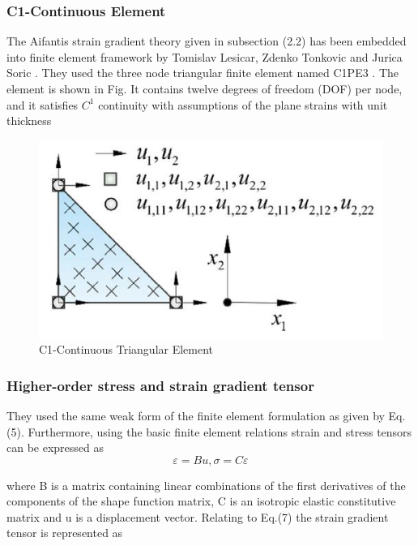 \documentclass[12pt]{article}
\begin{document}
\subsubsection{ C1-Continuous Element}
The Aifantis strain gradient theory given in subsection (2.2) has been embedded into finite element framework by Tomislav Lesicar, Zdenko Tonkovic and Jurica Soric \cite{lesivcar2017two}. They used the three node triangular finite element named C1PE3 \cite{putar2017damage}. The element is shown in
Fig. It contains twelve degrees of freedom (DOF) per node, and it satisfies $C^1$ continuity with assumptions of the plane strains with unit thickness
\newline
     \begin{figure}[H]
     	\begin{center}
	      \includegraphics[scale=0.8]{Tri_Element.JPG}  
	    \end{center}  
        \caption{C1-Continuous Triangular Element}
     \end{figure}
\subsubsection{ Higher-order stress and strain gradient tensor} 
They used the same weak form of the finite element formulation as given by Eq.(5). Furthermore, using the basic finite element relations strain and stress tensors can be expressed as
\begin{equation}
\varepsilon = Bu,      \sigma=C\varepsilon
\end{equation}
\newline

where B is a matrix containing linear combinations of the first derivatives of the components of the shape function matrix, C is an isotropic elastic constitutive matrix and u  is a displacement vector. Relating to Eq.(7) the strain gradient tensor is represented as
\end{document}
